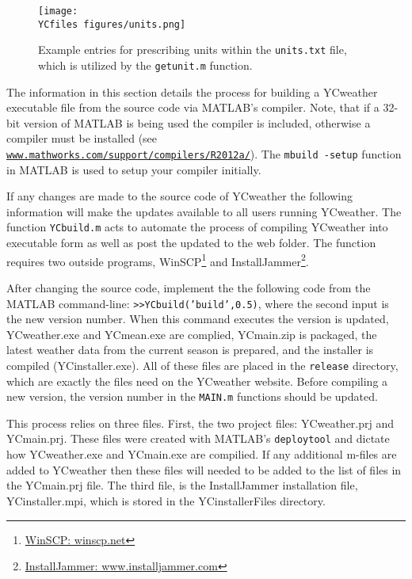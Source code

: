 \begin{figure}[!ht]\centering
	\texttt{[image: \\YCfiles figures/units.png]}
	\caption{Example entries for prescribing units within the \texttt{units.txt} file, which is utilized by the \texttt{getunit.m} function.}
	\label{fig:units}
\end{figure}

\label{sec:compile}
The information in this section details the process for building a YCweather executable file from the source code via MATLAB's compiler. Note, that if a 32-bit version of MATLAB is being used the compiler is included, otherwise a compiler must be installed (see \href{http://www.mathworks.com/support/compilers/R2010a/}{\nolinkurl{www.mathworks.com/support/compilers/R2012a/}}). The \texttt{mbuild -setup} function in MATLAB is used to setup your compiler initially.  

If any changes are made to the source code of YCweather the following information will make the updates available to all users running YCweather. The function \texttt{YCbuild.m} acts to automate the process of compiling YCweather into executable form as well as post the updated to the web folder.  The function requires two outside programs, WinSCP\footnote{\href{http://winscp.net}{WinSCP: winscp.net}} and InstallJammer\footnote{\href{http://www.installjammer.com/}{InstallJammer: www.installjammer.com}}.

After changing the source code, implement the the following code from the MATLAB command-line: \texttt{>>YCbuild('build',0.5)}, where the second input is the new version number.  When this command executes the version is updated, YCweather.exe and YCmean.exe are complied, YCmain.zip is packaged, the latest weather data from the current season is prepared, and the installer is compiled (YCinstaller.exe).  All of these files are placed in the \texttt{release} directory, which are exactly the files need on the YCweather website.  Before compiling a new version, the version number in the \texttt{MAIN.m} functions should be updated.

This process relies on three files.  First, the two project files: YCweather.prj and YCmain.prj.  These files were created with MATLAB's \texttt{deploytool} and dictate how YCweather.exe and YCmain.exe are compilied.  If any additional m-files are added to YCweather then these files will needed to be added to the list of files in the YCmain.prj file.  The third file, is the InstallJammer installation file, YCinstaller.mpi, which is stored in the YCinstallerFiles directory.

